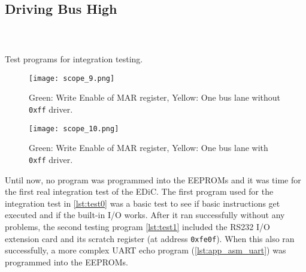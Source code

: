 \subsection{Driving Bus High}
\begin{listing}[t]
  \centering
  \begin{sublisting}[b]{.45\textwidth}
    \inputminted[linenos,
      breaklines,
      frame=leftline,
      xleftmargin=20pt,
    ]{ARM}{src/test0.s}
    \label{lst:test0}
  \end{sublisting}

  \begin{sublisting}[b]{.45\textwidth}
    \inputminted[linenos,
      breaklines,
      frame=leftline,
      xleftmargin=20pt,
    ]{ARM}{src/test1.s}
    \label{lst:test1}
  \end{sublisting}%
  \hspace{.05\textwidth}
  \begin{sublisting}[b]{.45\textwidth}
    \inputminted[linenos,
      breaklines,
      frame=leftline,
      xleftmargin=20pt,
    ]{ARM}{src/test2.s}
    \label{lst:test2}
  \end{sublisting}
  \caption{Test programs for integration testing.}
\end{listing}
\begin{figure}[t]
  \texttt{[image: scope\_9.png]}
  \caption{Green: Write Enable of \gls{MAR} register, Yellow: One bus lane without \texttt{0xff} driver.}
  \label{fig:busPullup}
\end{figure}
\begin{figure}[t]
  \texttt{[image: scope\_10.png]}
  \caption{Green: Write Enable of \gls{MAR} register, Yellow: One bus lane with \texttt{0xff} driver.}
  \label{fig:busPullupFix}
\end{figure}
Until now, no program was programmed into the \glspl{EEPROM} and it was time for the first real integration test of the \gls{EDiC}.
The first program used for the integration test in \cref{lst:test0} was a basic test to see if basic instructions get executed and if the built-in I/O works.
After it ran successfully without any problems, the second testing program \cref{lst:test1} included the RS232 I/O extension card and its scratch register (at address \texttt{0xfe0f}).
When this also ran successfully, a more complex \gls{UART} echo program (\cref{lst:app_asm_uart}) was programmed into the \glspl{EEPROM}.
